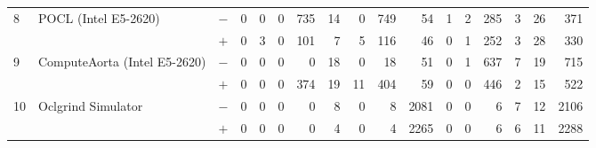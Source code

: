 \begin{tabular}{lll | rrrrrrr | rrrrrrr }
\hline
\multirow{ 2}{*}{8} & \multirow{ 2}{*}{POCL (Intel E5-2620)} & $-$ & 0 & 0 & 0 & 735 & 14 & 0 & 749       & 54 & 1 & 2 & 285 & 3 & 26 & 371 \\& & $+$ & 0 & 3 & 0 & 101 & 7 & 5 & 116 & 46 & 0 & 1 & 252 & 3 & 28 & 330 \\
\hline
\multirow{ 2}{*}{9} & \multirow{ 2}{*}{ComputeAorta (Intel E5-2620)} & $-$ & 0 & 0 & 0 & 0 & 18 & 0 & 18       & 51 & 0 & 1 & 637 & 7 & 19 & 715 \\& & $+$ & 0 & 0 & 0 & 374 & 19 & 11 & 404 & 59 & 0 & 0 & 446 & 2 & 15 & 522 \\
\hline
\multirow{ 2}{*}{10} & \multirow{ 2}{*}{Oclgrind Simulator} & $-$ & 0 & 0 & 0 & 0 & 8 & 0 & 8       & 2081 & 0 & 0 & 6 & 7 & 12 & 2106 \\& & $+$ & 0 & 0 & 0 & 0 & 4 & 0 & 4 & 2265 & 0 & 0 & 6 & 6 & 11 & 2288 \\
  \bottomrule
\end{tabular}

